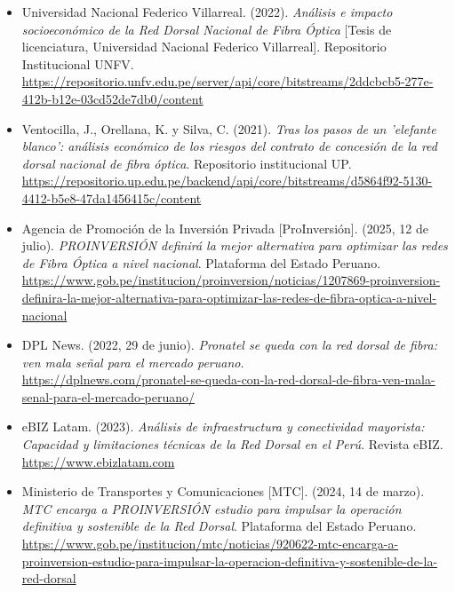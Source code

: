 \begin{itemize}[leftmargin=1.27cm, itemindent=-1.27cm, label={}, itemsep=12pt, parsep=0pt]
\item Universidad Nacional Federico Villarreal. (2022). \textit{Análisis e impacto socioeconómico de la Red Dorsal Nacional de Fibra Óptica} [Tesis de licenciatura, Universidad Nacional Federico Villarreal]. Repositorio Institucional UNFV.\\
\url{https://repositorio.unfv.edu.pe/server/api/core/bitstreams/2ddcbcb5-277e-412b-b12e-03cd52de7db0/content}

\item Ventocilla, J., Orellana, K. y Silva, C. (2021). \textit{Tras los pasos de un 'elefante blanco': análisis económico de los riesgos del contrato de concesión de la red dorsal nacional de fibra óptica}. Repositorio institucional UP.\\
\url{https://repositorio.up.edu.pe/backend/api/core/bitstreams/d5864f92-5130-4412-b5e8-47da1456415c/content}

\item Agencia de Promoción de la Inversión Privada [ProInversión]. (2025, 12 de julio). \textit{PROINVERSIÓN definirá la mejor alternativa para optimizar las redes de Fibra Óptica a nivel nacional}. Plataforma del Estado Peruano.\\
\url{https://www.gob.pe/institucion/proinversion/noticias/1207869-proinversion-definira-la-mejor-alternativa-para-optimizar-las-redes-de-fibra-optica-a-nivel-nacional}

\item DPL News. (2022, 29 de junio). \textit{Pronatel se queda con la red dorsal de fibra: ven mala señal para el mercado peruano}.\\
\url{https://dplnews.com/pronatel-se-queda-con-la-red-dorsal-de-fibra-ven-mala-senal-para-el-mercado-peruano/}

\item eBIZ Latam. (2023). \textit{Análisis de infraestructura y conectividad mayorista: Capacidad y limitaciones técnicas de la Red Dorsal en el Perú}. Revista eBIZ.\\
\url{https://www.ebizlatam.com}

\item Ministerio de Transportes y Comunicaciones [MTC]. (2024, 14 de marzo). \textit{MTC encarga a PROINVERSIÓN estudio para impulsar la operación definitiva y sostenible de la Red Dorsal}. Plataforma del Estado Peruano.\\
\url{https://www.gob.pe/institucion/mtc/noticias/920622-mtc-encarga-a-proinversion-estudio-para-impulsar-la-operacion-definitiva-y-sostenible-de-la-red-dorsal}


\end{itemize}
